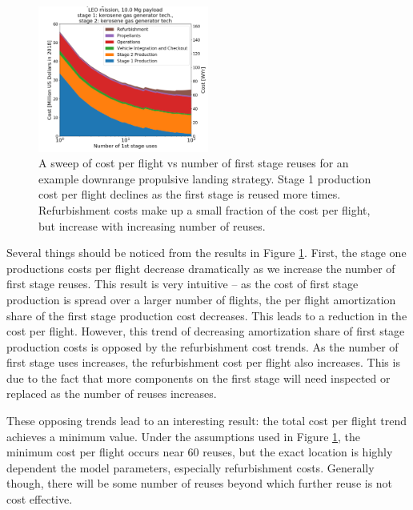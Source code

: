 \documentclass[conf]{new-aiaa}
\begin{document}
\begin{multicols}{2}
\begin{figure}[H]
    \centering
    \includegraphics[width=0.5\textwidth]{../../lvreuse/analysis/combined/plots/cpf_stackplot_reuses_sweep}
    \caption{\label{fig:cpf_stackplot_reuses_sweep} A sweep of cost per flight vs number of first stage reuses for an example downrange propulsive landing strategy. Stage 1 production cost per flight declines as the first stage is reused more times. Refurbishment costs make up a small fraction of the cost per flight, but increase with increasing number of reuses.}
\end{figure}

Several things should be noticed from the results in Figure \ref{fig:cpf_stackplot_reuses_sweep}. First, the stage one productions costs per flight decrease dramatically as we increase the number of first stage reuses. This result is very intuitive -- as the cost of first stage production is spread over a larger number of flights, the per flight amortization share of the first stage production cost decreases. This leads to a reduction in the cost per flight. However, this trend of decreasing amortization share of first stage production costs is opposed by the refurbishment cost trends. As the number of first stage uses increases, the refurbishment cost per flight also increases. This is due to the fact that more components on the first stage will need inspected or replaced  as the number of reuses increases. 

These opposing trends lead to an interesting result: the total cost per flight trend achieves a minimum value. Under the assumptions used in Figure \ref{fig:cpf_stackplot_reuses_sweep}, the minimum cost per flight occurs near 60 reuses, but the exact location is highly dependent the model parameters, especially refurbishment costs. Generally though, there will be some number of reuses beyond which further reuse is not cost effective.


\end{multicols}
\end{document}
